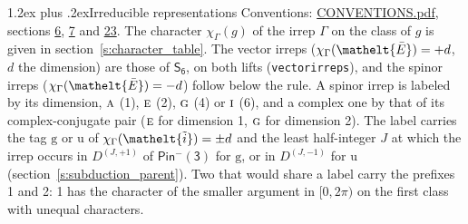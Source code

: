 \documentclass[10pt,a4paper]{article}
\makeatletter
\renewcommand\section{\@startsection{section}{1}{\z@}{-3ex plus -1ex minus -.2ex}%
  {1.2ex plus .2ex}{\normalfont\large\sffamily\bfseries\color{parttitle}}}
\numberwithin{equation}{section}
\newcommand{\eltfont}[1]{{\let\sigma\eltsigma\mathelt{#1}}}
\newcommand{\grp}[1]{\mathsf{#1}}
\newcommand{\irr}[1]{\text{\normalfont\scshape #1}}
\newcommand{\elt}[1]{\eltfont{#1}}
\newcommand{\ptag}[1]{\mathrm{#1}}
\newcommand{\irrJp}[2]{D^{(#1,#2)}}
\newcommand{\irchar}[1]{\chi_{#1}}
\newcommand{\barred}[1]{\bar{#1}}
\newcommand{\lift}[1]{\tilde{#1}}
\makeatother
\begin{document}
\section{Irreducible representations}\label{s:irreps}
Conventions: \href{../../CONVENTIONS.pdf}{CONVENTIONS.pdf}, sections \href{../../../rotation/CONVENTIONS.pdf\#conv.6}{6}, \href{../../../rotation/CONVENTIONS.pdf\#conv.7}{7} and \href{../../CONVENTIONS.pdf\#conv.23}{23}.
\leavevmode\label{n:function.character}\label{n:irrep.Gamma}The character $\irchar{\Gamma}(g)$ of the irrep $\Gamma$ on the class of $g$ is given in section~\ref{s:character_table}. \label{n:index.dimension}The vector irreps ($\irchar{\Gamma}(\elt{\barred{E}}) = +d$, $d$ the dimension) are those of \href{../../../rotation/data/pdf/S6.pdf}{$\grp{S_{6}}$}, on both lifts (\texttt{vectorirreps}), and the spinor irreps ($\irchar{\Gamma}(\elt{\barred{E}}) = -d$) follow below the rule. A spinor irrep is labeled by its dimension, $\irr{a}$ (1), $\irr{e}$ (2), $\irr{g}$ (4) or $\irr{i}$ (6), and a complex one by that of its complex-conjugate pair ($\irr{e}$ for dimension 1, $\irr{g}$ for dimension 2). The label carries the tag $\ptag{g}$ or $\ptag{u}$ of $\irchar{\Gamma}(\elt{\lift{i}}) = \pm d$ and the least half-integer $J$ at which the irrep occurs in $\irrJp{J}{+1}$ of $\grp{Pin^{-}(3)}$ for $\ptag{g}$, or in $\irrJp{J}{-1}$ for $\ptag{u}$ (section~\ref{s:subduction_parent}). Two that would share a label carry the prefixes 1 and 2: 1 has the character of the smaller argument in $[0, 2\pi)$ on the first class with unequal characters.
\end{document}
